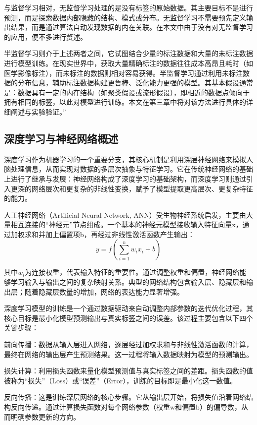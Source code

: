 \documentclass[twoside,openright]{xduugthesis}
\begin{document}
与监督学习相对，无监督学习处理的是没有标签的原始数据。其主要目标不是进行预测，而是探索数据内部隐藏的结构、模式或分布。无监督学习不需要预先定义输出结果，而是通过算法自动发现数据的内在关联。在本文中由于没有对无监督学习的应用，便不多进行赘述。

半监督学习则介于上述两者之间，它试图结合少量的标注数据和大量的未标注数据进行模型训练。在现实世界中，获取大量精确标注的数据往往成本高昂且耗时（如医学影像标注），而未标注的数据则相对容易获得。半监督学习通过利用未标注数据的分布信息，辅助标注数据构建更鲁棒、泛化能力更强的模型。其基本假设通常是：数据具有一定的内在结构（如聚类假设或流形假设），即相近的数据点倾向于拥有相同的标签，以此对模型进行训练。本文在第三章中将对该方法进行具体的详细阐述与实验验证。”

\subsection{深度学习与神经网络概述}
深度学习作为机器学习的一个重要分支，其核心机制是利用深层神经网络来模拟人脑处理信息，从而实现对数据的多层次抽象与特征学习。它在传统神经网络的基础上进行了继承与发展：神经网络构成了深度学习的基础架构，而深度学习则通过引入更深的网络层次和更复杂的非线性变换，赋予了模型提取更高层次、更复杂特征的能力。

人工神经网络（Artificial Neural Network, ANN）受生物神经系统启发，主要由大量相互连接的“神经元”节点组成。一个基本的神经元模型接收输入特征向量x，通过加权求和并加上偏置项b，再经过非线性激活函数产生输出：
\begin{equation}
    y = f\left( \sum_{i=1}^{n} w_i x_i + b \right)
\end{equation}

其中$w_i$为连接权重，代表输入特征的重要性。通过调整权重和偏置，神经网络能够学习输入与输出之间的复杂映射关系。典型的网络结构包含输入层、隐藏层和输出层；随着隐藏层数量的增加，网络的表达能力显著增强。

深度学习模型的训练是一个通过数据驱动来自动调整内部参数的迭代优化过程，其核心目标是最小化模型预测输出与真实标签之间的误差。该过程主要包含以下四个关键步骤：

前向传播：数据从输入层进入网络，逐层经过加权求和与非线性激活函数的计算，最终在网络的输出层产生预测结果。这一过程将输入数据映射为模型的预测输出。

损失计算：利用损失函数来量化模型预测值与真实标签之间的差距。损失函数的值被称为“损失”（Loss）或“误差”（Error），训练的目标即是最小化这一数值。

反向传播：这是训练深层网络的核心步骤。它从输出层开始，将损失值沿着网络结构反向传递。通过计算损失函数对每个网络参数（权重w和偏置b）的偏导数，从而明确参数更新的方向。
\end{document}
